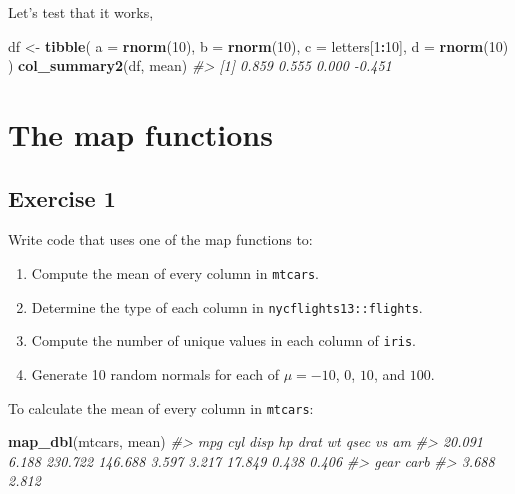 \documentclass[]{book}
\newenvironment{Shaded}{\begin{snugshade}}{\end{snugshade}}
\newcommand{\CommentTok}[1]{\textcolor[rgb]{0.56,0.35,0.01}{\textit{#1}}}
\newcommand{\DataTypeTok}[1]{\textcolor[rgb]{0.13,0.29,0.53}{#1}}
\newcommand{\DecValTok}[1]{\textcolor[rgb]{0.00,0.00,0.81}{#1}}
\newcommand{\KeywordTok}[1]{\textcolor[rgb]{0.13,0.29,0.53}{\textbf{#1}}}
\newcommand{\NormalTok}[1]{#1}
\newcommand{\OperatorTok}[1]{\textcolor[rgb]{0.81,0.36,0.00}{\textbf{#1}}}
\newcommand{\StringTok}[1]{\textcolor[rgb]{0.31,0.60,0.02}{#1}}
\providecommand{\tightlist}{%
  \setlength{\itemsep}{0pt}\setlength{\parskip}{0pt}}
\theoremstyle{plain}
\theoremstyle{remark}
\theoremstyle{definition}
\theoremstyle{definition}
\theoremstyle{definition}
\theoremstyle{remark}
\begin{document}
Let's test that it works,

\begin{Shaded}
\begin{Highlighting}[]
\NormalTok{df <-}\StringTok{ }\KeywordTok{tibble}\NormalTok{(}
  \DataTypeTok{a =} \KeywordTok{rnorm}\NormalTok{(}\DecValTok{10}\NormalTok{),}
  \DataTypeTok{b =} \KeywordTok{rnorm}\NormalTok{(}\DecValTok{10}\NormalTok{),}
  \DataTypeTok{c =}\NormalTok{ letters[}\DecValTok{1}\OperatorTok{:}\DecValTok{10}\NormalTok{],}
  \DataTypeTok{d =} \KeywordTok{rnorm}\NormalTok{(}\DecValTok{10}\NormalTok{)}
\NormalTok{)}
\KeywordTok{col_summary2}\NormalTok{(df, mean)}
\CommentTok{#> [1]  0.859  0.555  0.000 -0.451}
\end{Highlighting}
\end{Shaded}

\hypertarget{the-map-functions}{%
\section{The map functions}\label{the-map-functions}}

\hypertarget{exercise-1-60}{%
\subsection{Exercise 1}\label{exercise-1-60}}

Write code that uses one of the map functions to:

\begin{enumerate}
\def\labelenumi{\arabic{enumi}.}
\tightlist
\item
  Compute the mean of every column in \texttt{mtcars}.
\item
  Determine the type of each column in \texttt{nycflights13::flights}.
\item
  Compute the number of unique values in each column of \texttt{iris}.
\item
  Generate 10 random normals for each of \(\mu = -10\), \(0\), \(10\),
  and \(100\).
\end{enumerate}

To calculate the mean of every column in \texttt{mtcars}:

\begin{Shaded}
\begin{Highlighting}[]
\KeywordTok{map_dbl}\NormalTok{(mtcars, mean)}
\CommentTok{#>     mpg     cyl    disp      hp    drat      wt    qsec      vs      am }
\CommentTok{#>  20.091   6.188 230.722 146.688   3.597   3.217  17.849   0.438   0.406 }
\CommentTok{#>    gear    carb }
\CommentTok{#>   3.688   2.812}
\end{Highlighting}
\end{Shaded}
\end{document}
